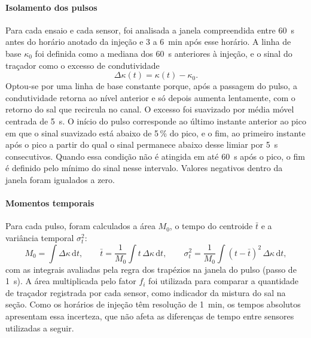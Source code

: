 \documentclass[12pt,a4paper]{article}
\begin{document}
\paragraph{Isolamento dos pulsos}
Para cada ensaio e cada sensor, foi analisada a janela compreendida entre 60~s antes do horário anotado da injeção e 3 a 6~min após esse horário. A linha de base $\kappa_{0}$ foi definida como a mediana dos 60~s anteriores à injeção, e o sinal do traçador como o excesso de condutividade
\begin{equation}
  \Delta\kappa(t) = \kappa(t) - \kappa_{0}.
  \label{eq:excesso}
\end{equation}
Optou-se por uma linha de base constante porque, após a passagem do pulso, a condutividade retorna ao nível anterior e só depois aumenta lentamente, com o retorno do sal que recircula no canal. O excesso foi suavizado por média móvel centrada de 5~s. O início do pulso corresponde ao último instante anterior ao pico em que o sinal suavizado está abaixo de 5\,\% do pico, e o fim, ao primeiro instante após o pico a partir do qual o sinal permanece abaixo desse limiar por 5~s consecutivos. Quando essa condição não é atingida em até 60~s após o pico, o fim é definido pelo mínimo do sinal nesse intervalo. Valores negativos dentro da janela foram igualados a zero.

\paragraph{Momentos temporais}
Para cada pulso, foram calculados a área $M_0$, o tempo do centroide $\bar{t}$ e a variância temporal $\sigma_t^2$:
\begin{equation}
  M_0 = \int \Delta\kappa\,\mathrm{d}t, \qquad
  \bar{t} = \frac{1}{M_0}\int t\,\Delta\kappa\,\mathrm{d}t, \qquad
  \sigma_t^{2} = \frac{1}{M_0}\int (t-\bar{t})^{2}\,\Delta\kappa\,\mathrm{d}t,
  \label{eq:momentos}
\end{equation}
com as integrais avaliadas pela regra dos trapézios na janela do pulso (passo de 1~s). A área multiplicada pelo fator $f_i$ foi utilizada para comparar a quantidade de traçador registrada por cada sensor, como indicador da mistura do sal na seção. Como os horários de injeção têm resolução de 1~min, os tempos absolutos apresentam essa incerteza, que não afeta as diferenças de tempo entre sensores utilizadas a seguir.
\end{document}
